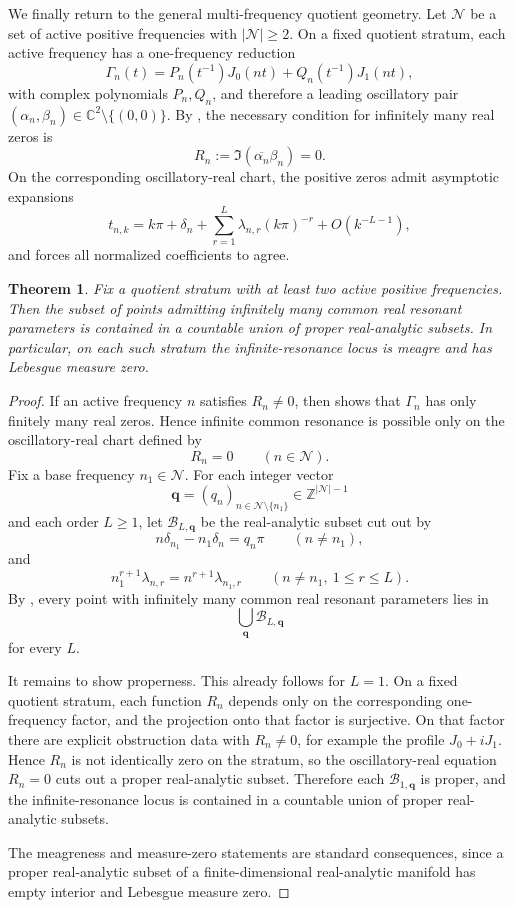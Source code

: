 \documentclass[11pt,reqno]{amsart}
\newtheorem{theorem}{Theorem}[section]
\theoremstyle{definition}
\newcommand{\C}{\mathbb{C}}
\newcommand{\Z}{\mathbb{Z}}
\newcommand{\abs}[1]{\left\lvert #1 \right\rvert}
\begin{document}
We finally return to the general multi-frequency quotient geometry. Let $\mathcal N$ be a set of
active positive frequencies with $\abs{\mathcal N}\ge 2$. On a fixed quotient stratum, each
active frequency has a one-frequency reduction
\[
\Gamma_n(t)=P_n(t^{-1})J_0(nt)+Q_n(t^{-1})J_1(nt),
\]
with complex polynomials $P_n,Q_n$, and therefore a leading oscillatory pair
$(\alpha_n,\beta_n)\in\C^2\setminus\{(0,0)\}$. By , the
necessary condition for infinitely many real zeros is
\[
R_n:=\Im(\overline{\alpha_n}\beta_n)=0.
\]
On the corresponding oscillatory-real chart, the positive zeros admit asymptotic expansions
\[
t_{n,k}
=
k\pi+\delta_n+\sum_{r=1}^L \lambda_{n,r}(k\pi)^{-r}+O(k^{-L-1}),
\]
and  forces all normalized coefficients to agree.

\begin{theorem}\label{thm:generic-finite-resonance}
Fix a quotient stratum with at least two active positive frequencies. Then the subset of points
admitting infinitely many common real resonant parameters is contained in a countable union of
proper real-analytic subsets. In particular, on each such stratum the infinite-resonance locus
is meagre and has Lebesgue measure zero.
\end{theorem}

\begin{proof}
If an active frequency $n$ satisfies $R_n\neq 0$, then  shows that
$\Gamma_n$ has only finitely many real zeros. Hence infinite common resonance is possible only on
the oscillatory-real chart defined by
\[
R_n=0
\qquad (n\in\mathcal N).
\]
Fix a base frequency $n_1\in\mathcal N$. For each integer vector
\[
\mathbf q=(q_n)_{n\in\mathcal N\setminus\{n_1\}}\in\Z^{\abs{\mathcal N}-1}
\]
and each order $L\ge 1$, let $\mathscr B_{L,\mathbf q}$ be the real-analytic subset cut out by
\[
n\delta_{n_1}-n_1\delta_n=q_n\pi
\qquad (n\neq n_1),
\]
and
\[
n_1^{r+1}\lambda_{n,r}=n^{r+1}\lambda_{n_1,r}
\qquad (n\neq n_1,\ 1\le r\le L).
\]
By , every point with infinitely many common real resonant
parameters lies in
\[
\bigcup_{\mathbf q}\mathscr B_{L,\mathbf q}
\]
for every $L$.

It remains to show properness. This already follows for $L=1$. On a fixed quotient stratum, each
function $R_n$ depends only on the corresponding one-frequency factor, and the projection onto
that factor is surjective. On that factor there are explicit obstruction data with $R_n\neq 0$,
for example the profile $J_0+iJ_1$. Hence $R_n$ is not identically zero on the stratum, so the
oscillatory-real equation $R_n=0$ cuts out a proper real-analytic subset. Therefore each
$\mathscr B_{1,\mathbf q}$ is proper, and the infinite-resonance locus is contained in a
countable union of proper real-analytic subsets.

The meagreness and measure-zero statements are standard consequences, since a proper
real-analytic subset of a finite-dimensional real-analytic manifold has empty interior and
Lebesgue measure zero.
\end{proof}
\end{document}
